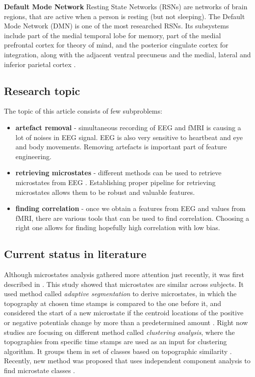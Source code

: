 \documentclass{article}
\begin{document}
\textbf{Default Mode Network}
Resting State Networks (RSNs) are networks of brain regions, that are active when a person is resting (but not sleeping). The Default Mode Network (DMN) is one of the most researched RSNs. Its subsystems include part of the medial temporal lobe for memory, part of the medial prefrontal cortex for theory of mind, and the posterior cingulate cortex for integration, along with the adjacent ventral precuneus and the medial, lateral and inferior parietal cortex \cite{dmn_description}.

\subsection{Research topic}
The topic of this article consists of few subproblems: 
\begin{itemize}
\item \textbf{artefact removal} - simultaneous recording of EEG and fMRI is causing a lot of noises in EEG signal. EEG is also very sensitive to heartbeat and eye and body movements. Removing artefacts is important part of feature engineering. 
\item \textbf{retrieving microstates} - different methods can be used to retrieve microstates from EEG \cite{Khanna2015105}. Establishing proper pipeline for retrieving microstates allows them to be robust and valuable features. 
\item \textbf{finding correlation} - once we obtain a features from EEG and values from fMRI, there are various tools that can be used to find correlation. Choosing a right one allows for finding hopefully high correlation with low bias. 
\end{itemize}
\subsection{Current status in literature}
Although microstates analysis gathered more attention just recently, it was first described in \cite{lehmann1980reference}. This study showed that microstates are similar across subjects. It used method called \emph{adaptive segmentation} to derive microstates, in which the topography at chosen time stamps is compared to the one before it, and considered the start of a new microstate if the centroid locations of the positive or negative potentials change by more than a predetermined amount \cite{Khanna2015105}. Right now studies are focusing on different method called \emph{clustering analysis}, where the topographies from specific time stamps are used as an input for clustering algorithm. It groups them in set of classes based on topographic similarity \cite{Michel2009}. Recently, new method was proposed that uses independent component analysis to find microstate classes \cite{Yuan20122062}.
\end{document}
